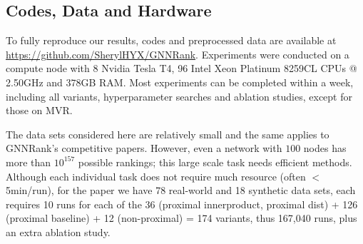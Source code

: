 \documentclass[nohyperref]{article}
\theoremstyle{plain}
\theoremstyle{definition}
\theoremstyle{remark}
\begin{document}
\subsection{Codes, Data and Hardware}
To fully  reproduce our results, codes and preprocessed data are available at \url{https://github.com/SherylHYX/GNNRank}. Experiments were conducted on a compute node with 8 Nvidia Tesla T4, 96 Intel Xeon Platinum 8259CL CPUs @ 2.50GHz and $378$GB RAM. Most experiments can be completed within a week, including all variants,  hyperparameter searches and ablation studies, except for those on MVR. 

The data sets considered here are relatively small and the same applies to GNNRank's competitive papers. However, even a network with $100$ nodes has more than $10^{157}$ possible rankings; this large scale task  needs efficient methods. Although each individual task does not require much resource (often $<$ 5min/run), 
for the paper we have 78 real-world and 18 synthetic data sets, 
each requires 10 runs for each of the 36 (proximal innerproduct, proximal dist) + 126 (proximal baseline) + 12 (non-proximal) = 174 variants, thus 167,040 runs, plus an extra ablation study.
\end{document}
